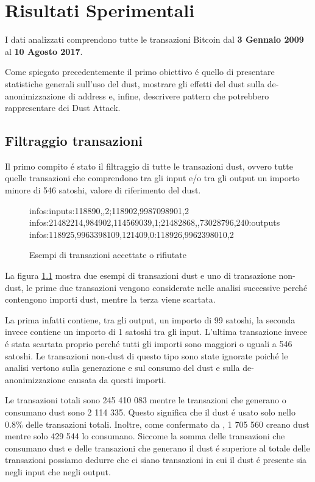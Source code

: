 \chapter{Risultati Sperimentali}
\captionsetup[table]{name=Tabella}
I dati analizzati comprendono tutte le transazioni Bitcoin dal \textbf{3 Gennaio 2009} al \textbf{10 Agosto 2017}.

Come spiegato precedentemente il primo obiettivo é quello di presentare statistiche generali sull'uso del dust, mostrare gli effetti del dust sulla de-anonimizzazione di address e, infine, descrivere pattern che potrebbero rappresentare dei Dust Attack.

\section{Filtraggio transazioni}
Il primo compito é stato il filtraggio di tutte le transazioni dust, ovvero tutte quelle transazioni che comprendono tra gli input e/o tra gli output un importo minore di 546 satoshi, valore di riferimento del dust.
\begin{figure}[H]
\begin{mdframed}
 infos:inputs:118890,,2;118902,9987098901,2 \checkmark\\
 infos:21482214,984902,114569039,1;21482868,,73028796,240:outputs \checkmark\\
 infos:118925,9963398109,121409,0:118926,9962398010,2 
\end{mdframed}
\caption{Esempi di transazioni accettate o rifiutate}
\label{tx_dust}
\end{figure}
\Floatbarrier
La figura \ref{tx_dust} mostra due esempi di transazioni dust e uno di transazione non-dust, le prime due transazioni vengono considerate nelle analisi successive perché contengono importi dust, mentre la terza viene scartata. 

La prima infatti contiene, tra gli output, un importo di 99 satoshi, la seconda invece contiene un importo di 1 satoshi tra gli input. L'ultima transazione invece é stata scartata proprio perché tutti gli importi sono maggiori o uguali a 546 satoshi. Le transazioni non-dust di questo tipo sono state ignorate poiché le analisi vertono sulla generazione e sul consumo del dust e sulla de-anonimizzazione causata da questi importi.

Le transazioni totali sono 245 410 083 mentre le transazioni che generano o consumano dust sono  2 114 335. Questo significa che il dust é usato solo nello 0.8\% delle transazioni totali. Inoltre, come confermato da \cite{dustAnalisi}, 1 705 560 creano dust mentre solo 429 544 lo consumano. Siccome la somma delle transazioni che consumano dust e delle transazioni che generano il dust é superiore al totale delle transazioni possiamo dedurre che ci siano transazioni in cui il dust é presente sia negli input che negli output.

